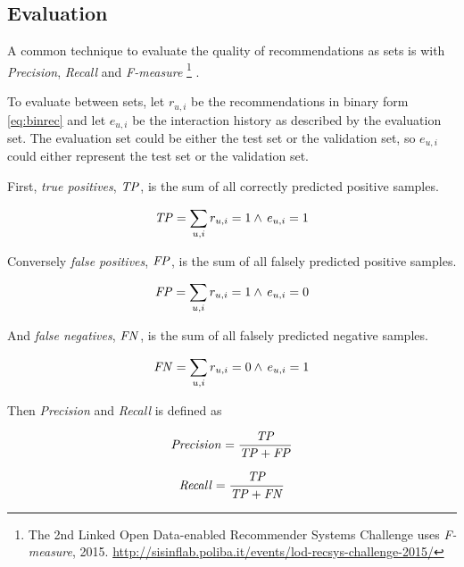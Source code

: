 
\subsection{Evaluation}\label{sec:background:theory:eval}

A common technique to evaluate the quality of recommendations as sets is with \textit{Precision}, \textit{Recall} and \textit{F-measure}
\footnote{The 2nd Linked Open Data-enabled Recommender Systems Challenge uses \textit{F-measure}, 2015. \url{http://sisinflab.poliba.it/events/lod-recsys-challenge-2015/}}
 \citep{bobadilla2013recommender}.

To evaluate between sets, let $r_{u, i}$ be the recommendations in binary form \eqref{eq:binrec} and let $e_{u, i}$ be the interaction history as described by the evaluation set. The evaluation set could be either the test set or the validation set, so $e_{u, i}$ could either represent the test set or the validation set.

First, \textit{true positives}, $\mathit{TP}$, is the sum of all correctly predicted positive samples.

\begin{equation} \label{eq:tp}
    \mathit{TP} = \sum_{u, i} r_{u, i} = 1 \land \, e_{u, i} = 1
\end{equation}

Conversely \textit{false positives}, $\mathit{FP}$, is the sum of all falsely predicted positive samples.

\begin{equation} \label{eq:fp}
    \mathit{FP} = \sum_{u, i} r_{u, i} = 1 \land \, e_{u, i} = 0
\end{equation}

And \textit{false negatives}, $\mathit{FN}$, is the sum of all falsely predicted negative samples.

\begin{equation} \label{eq:fn}
    \mathit{FN} = \sum_{u, i} r_{u, i} = 0 \land \, e_{u, i} = 1
\end{equation}

Then \textit{Precision} and \textit{Recall} is defined as

\begin{equation} \label{eq:precision}
    \mathit{Precision} = \frac{\mathit{TP}}{\mathit{TP} + \mathit{FP}}
\end{equation}

\begin{equation} \label{eq:recall}
    \mathit{Recall} = \frac{\mathit{TP}}{\mathit{TP} + \mathit{FN}}
\end{equation}

